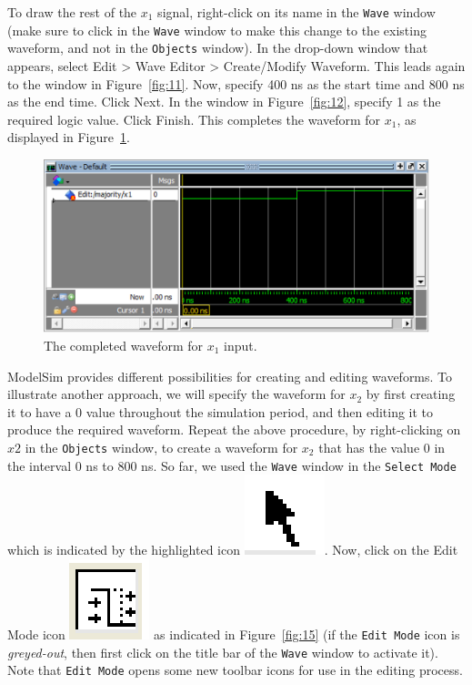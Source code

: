 \documentclass[11pt, twoside, pdftex]{article}
\begin{document}
To draw the rest of the $x_1$ signal, right-click on its name in the \texttt{Wave} window (make
sure to click in the \texttt{Wave} window to make this 
change to the existing waveform, and not in the \texttt{Objects} window).
In the drop-down window that appears, select {\sf Edit > Wave Editor > Create/Modify Waveform}.
This leads again to the window in Figure~\ref{fig:11}. Now, specify 400 ns as the start time
and 800 ns as the end time. Click {\sf Next}. In the window in Figure~\ref{fig:12}, specify
1 as the required logic value. Click {\sf Finish}. This completes the waveform for $x_1$,
as displayed in Figure~\ref{fig:14}.

\begin{figure}[H]
   \begin{center}
      \includegraphics[scale=0.75]{figures/figure14.png}
   \caption{The completed waveform for $x_1$ input.} 
	 \label{fig:14}
	 \end{center}
\end{figure}

ModelSim provides different possibilities for creating and editing waveforms. To illustrate another
approach, we will specify the waveform for $x_2$ by first creating it to have a 0 value
throughout the simulation period, and then editing it to produce the required waveform.
Repeat the above procedure, by right-clicking on $x2$ in the \texttt{Objects} window,
to create a waveform for $x_2$ that has the value 0 in the interval 0 ns to 800 ns. 
So far, we used the \texttt{Wave} window in the \texttt{Select Mode} which is indicated by the 
highlighted icon  \includegraphics[scale=1]{figures/icon2.png}. Now, click on the {\sf Edit Mode}
icon \includegraphics[scale=1]{figures/icon3.png} as indicated in Figure~\ref{fig:15} 
(if the \texttt{Edit Mode} icon is {\it greyed-out}, then first click on the title bar of the 
\texttt{Wave} window to activate it).  Note that \texttt{Edit Mode} opens some new toolbar 
icons for use in the editing process.
\end{document}
